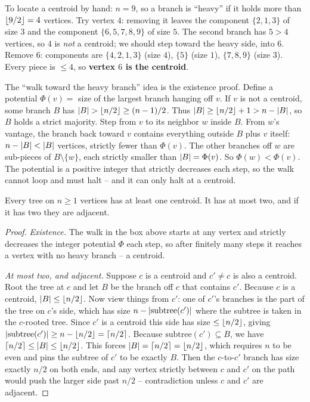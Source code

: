 To locate a centroid by hand: $n=9$, so a branch is ``heavy'' if it
holds more than $\lfloor9/2\rfloor=4$ vertices. Try vertex $4$: removing it leaves the
component $\{2,1,3\}$ of size $3$ and the component $\{6,5,7,8,9\}$ of size $5$.
The second branch has $5>4$ vertices, so $4$ is \emph{not} a centroid; we should
step toward the heavy side, into $6$. Remove $6$: components are $\{4,2,1,3\}$
(size $4$), $\{5\}$ (size $1$), $\{7,8,9\}$ (size $3$). Every piece is $\le 4$, so
\textbf{vertex $6$ is the centroid}.

\begin{whybox}
The ``walk toward the heavy branch'' idea is the existence proof.
Define a potential $\Phi(v)=$ size of the largest branch hanging off $v$. If $v$
is not a centroid, some branch $B$ has $\lvert B\rvert>\lfloor n/2\rfloor\ge (n-1)/2$.
Thus $\lvert B\rvert\ge \lfloor n/2\rfloor+1 > n - \lvert B\rvert$, so $B$ holds a strict majority. Step
from $v$ to its neighbor $w$ inside $B$. From $w$'s vantage, the branch back
toward $v$ contains everything outside $B$ plus $v$ itself: $n-\lvert B\rvert < \lvert B\rvert$
vertices, strictly fewer than $\Phi(v)$. The other branches off $w$ are sub-pieces
of $B\setminus\{w\}$, each strictly smaller than $\lvert B\rvert=\Phi(v)$. So
$\Phi(w)<\Phi(v)$. The potential is a positive integer that strictly decreases
each step, so the walk cannot loop and must halt -- and it can only halt at a
centroid.
\end{whybox}

\begin{theorem}
\label{ch20:thm-exists}
Every tree on $n\ge 1$ vertices has at least one centroid. It has at most two, and if
it has two they are adjacent.
\end{theorem}

\begin{proof}
\emph{Existence.} The walk in the box above starts at any vertex and strictly
decreases the integer potential $\Phi$ each step, so after finitely many steps it
reaches a vertex with no heavy branch -- a centroid.

\emph{At most two, and adjacent.} Suppose $c$ is a centroid and $c'\neq c$ is also
a centroid. Root the tree at $c$ and let $B$ be the branch off $c$ that contains
$c'$. Because $c$ is a centroid, $\lvert B\rvert\le\lfloor n/2\rfloor$. Now view things from
$c'$: one of $c'$'s branches is the part of the tree on $c$'s side, which has size
$n-\lvert\mathrm{subtree}(c')\rvert$ where the subtree is taken in the $c$-rooted tree.
Since $c'$ is a centroid this side has size $\le\lfloor n/2\rfloor$, giving
$\lvert\mathrm{subtree}(c')\rvert\ge n-\lfloor n/2\rfloor=\lceil n/2\rceil$.
Because $\mathrm{subtree}(c')\subseteq B$, we have $\lceil n/2\rceil\le\lvert B\rvert\le\lfloor n/2\rfloor$.
This forces $\lvert B\rvert=\lceil n/2\rceil=\lfloor n/2\rfloor$, which requires $n$ to be even and pins the subtree of
$c'$ to be exactly $B$. Then the $c$-to-$c'$ branch has size exactly $n/2$ on both
ends, and any vertex strictly between $c$ and $c'$ on the path would push the
larger side past $n/2$ -- contradiction unless $c$ and $c'$ are adjacent.
\end{proof}


